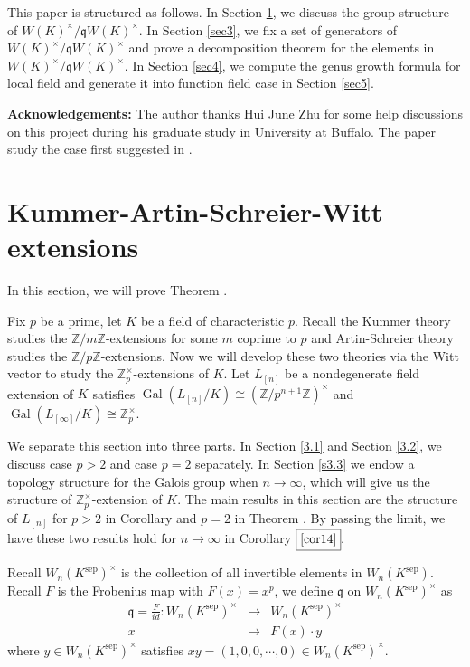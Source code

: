 \documentclass{proc-l}
\theoremstyle{definition}
\theoremstyle{remark}
\numberwithin{equation}{section}
\DeclareMathOperator{\Gal}{Gal}
\DeclareMathOperator{\sep}{sep}
\begin{document}
{This paper is structured as follows. In Section \ref{sec2}, we discuss the group structure of $W(K)^\times/\mathfrak qW(K)^\times$. In Section \ref{sec3}, we fix a set of generators of $W(K)^\times/\mathfrak qW(K)^\times$ and prove a decomposition theorem for the elements in $W(K)^\times/\mathfrak qW(K)^\times$. In Section \ref{sec4}, we compute the genus growth formula for local field and generate it into function field case in Section \ref{sec5}.

\textbf{Acknowledgements:} The author thanks Hui June Zhu for some help discussions on this project during his graduate study in University at Buffalo. The paper study the case first suggested in \cite[Remark 3.3]{kosters2016arithmeticzpextensions}.


\section{Kummer-Artin-Schreier-Witt extensions}\label{sec2}

In this section, we will prove Theorem \boxed{\ref{thm2}}.

Fix $p$ be a prime, let $K$ be a field of characteristic $p$. Recall the Kummer theory studies the $\mathbb Z/m\mathbb Z$-extensions for some $m$ coprime to $p$ and Artin-Schreier theory studies the $\mathbb Z/p\mathbb Z$-extensions. Now we will develop these two theories via the Witt vector to study the $\mathbb Z_p^\times$-extensions of $K$. Let $L_{[n]}$ be a nondegenerate field extension of $K$ satisfies $\Gal(L_{[n]}/K)\cong(\mathbb Z/p^{n+1}\mathbb Z)^\times$ and $\Gal(L_{[\infty]}/K)\cong\mathbb Z_p^\times$. 

We separate this section into three parts.  In Section \ref{3.1} and Section \ref{3.2}, we discuss case $p>2$ and case $p=2$ separately. In Section \ref{s3.3} we endow a topology structure for the Galois group when $n\rightarrow\infty$, which will give us the structure of $\mathbb Z_p^\times$-extension of $K$. The main results in this section are the structure of $L_{[n]}$ for $p>2$ in Corollary \boxed{\ref{2.10}} and $p=2$ in Theorem \boxed{\ref{2.17}}. By passing the limit, we have these two results hold for $n\rightarrow\infty$ in Corollary $\boxed{\ref{cor14}}.$   %


Recall $W_n(K^{\sep})^\times$ is the collection of all invertible elements in $W_n(K^{\sep})$. Recall $F$ is the Frobenius map with $F(x)=x^p$, we define $\mathfrak q$ on $W_n(K^{\sep})^\times$ as
\begin{eqnarray*}
\mathfrak q=\frac{F}{id}: W_n(K^{\sep})^\times&\rightarrow& W_n(K^{\sep})^\times\\
x&\mapsto&F(x)\cdot y
\end{eqnarray*}
where $y\in W_n(K^{\sep})^\times$ satisfies $xy=(1,0,0,\cdots,0)\in W_n(K^{\sep})^\times$. 

}
\end{document}
